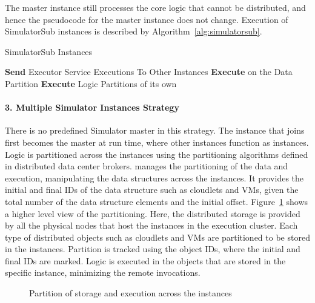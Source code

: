 The master instance still processes the core logic that cannot be distributed, and hence the pseudocode for the master instance does not change. Execution of SimulatorSub instances is described by Algorithm~\ref{alg:simulatorsub}.
\begin{algorithm}
  \caption{SimulatorSub Instances}
\label{alg:simulatorsub}
  \begin{algorithmic}
\Repeat
\While{  }
\State \textbf{Send} Executor Service Executions To Other Instances
\State \textbf{Execute} on the Data Partition
\State \textbf{Execute} Logic Partitions of its own
\EndWhile
\Until 
\State  
  \end{algorithmic}
\end{algorithm}

\paragraph*{3. Multiple Simulator Instances Strategy}
There is no predefined Simulator master in this strategy. The instance that joins first becomes the master at run time, where other instances function as  instances. Logic is partitioned across the instances using the partitioning algorithms defined in  distributed data center brokers.  manages the partitioning of the data and execution, manipulating the data structures across the instances. It provides the initial and final IDs of the data structure such as cloudlets and VMs, given the total number of the data structure elements and the initial offset. Figure~\ref{fig:partition} shows a higher level view of the partitioning. Here, the distributed storage is provided by all the physical nodes that host the instances in the execution cluster. Each type of distributed objects such as cloudlets and VMs are partitioned to be stored in the instances. Partition is tracked using the object IDs, where the initial and final IDs are marked. Logic is executed in the objects that are stored in the specific instance, minimizing the remote invocations.

\begin{figure}[!htbp]
\begin{center}
\end{center}
 \caption{Partition of storage and execution across the instances}
 \label{fig:partition}
\end{figure}


